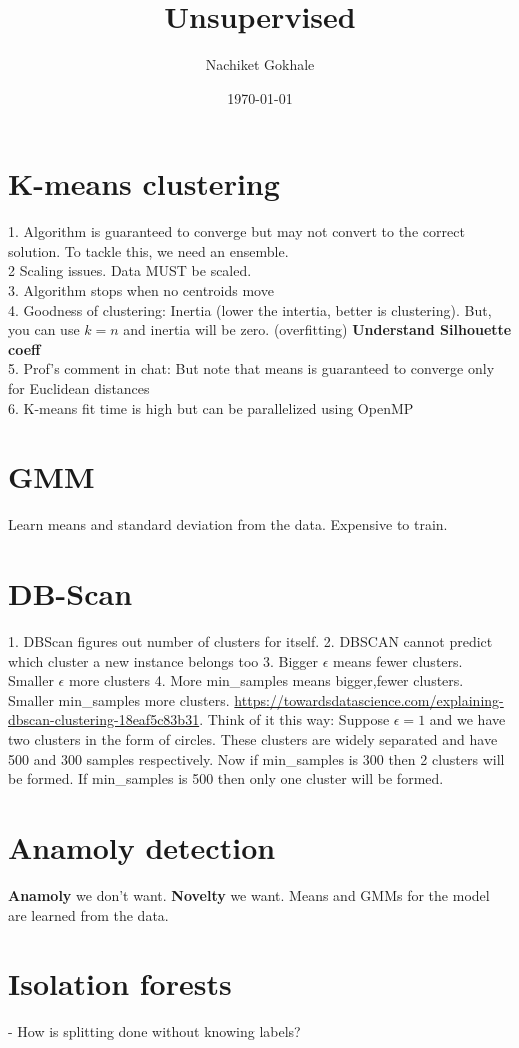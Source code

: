 \documentclass{article}
\begin{document}
\title{Unsupervised}
\author{Nachiket Gokhale}
\date{\today}
\maketitle
\section{K-means clustering}
1. Algorithm is guaranteed to converge but may not convert to the correct solution. To tackle this, we need an ensemble.\\
2 Scaling issues. Data MUST be scaled.\\
3. Algorithm stops when no centroids move\\
4. Goodness of clustering: Inertia (lower the intertia, better is clustering). But, you can use $k=n$ and inertia will be zero. (overfitting) \textbf{Understand Silhouette coeff}\\
5. Prof's comment in chat: But note that means is guaranteed to converge only for Euclidean distances\\
6. K-means fit time is high but can be parallelized using OpenMP


\section{GMM}
Learn means and standard deviation from the data. Expensive to train.

\section{DB-Scan}
1. DBScan figures out number of clusters for itself.
2. DBSCAN cannot predict which cluster a new instance belongs too
3. Bigger $\epsilon$ means fewer clusters. Smaller $\epsilon$ more clusters
4. More min\_samples means bigger,fewer clusters. Smaller min\_samples more clusters. \url{https://towardsdatascience.com/explaining-dbscan-clustering-18eaf5c83b31}. Think of it this way: Suppose $\epsilon=1$ and we have two clusters in the form of circles. These clusters are widely separated and have 500 and 300 samples respectively. Now if min\_samples is 300 then 2 clusters will be formed. If min\_samples is 500 then only one cluster will be formed. 

\section{Anamoly detection}
\textbf{Anamoly} we don't want. \textbf{Novelty} we want. Means and GMMs for the model are learned from the data.

\section{Isolation forests}
- How is splitting done without knowing labels?
\end{document}
